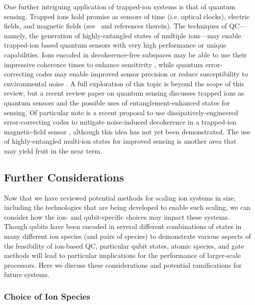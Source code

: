 \documentclass[%
12pt,
 amsmath,amssymb,
]{revtex4-2}
\begin{document}
One further intriguing application of trapped-ion systems is that of quantum sensing. Trapped ions hold promise as sensors of time (i.e. optical clocks), electric fields, and magnetic fields (see~\cite{DegenQuantumSensingRMP2017} and references therein). The techniques of QC---namely, the generation of highly-entangled states of multiple ions---may enable trapped-ion based quantum sensors with very high performance or unique capabilities. Ions encoded in decoherence-free subspaces may be able to use their impressive coherence times to enhance sensitivity \cite{SchmidtKalerEntangledSensor2012}, while quantum error-correcting codes may enable improved sensor precision or reduce susceptibility to environmental noise \cite{OzeriHeisenberg2013, DurImprovedmetrology2014}. A full exploration of this topic is beyond the scope of this review, but a recent review paper on quantum sensing \cite{DegenQuantumSensingRMP2017} discusses trapped ions as quantum sensors and the possible uses of entanglement-enhanced states for sensing. Of particular note is a recent proposal to use dissipatively-engineered error-correcting codes to mitigate noise-induced decoherence in a trapped-ion magnetic-field sensor \cite{ReiterDissipativeSensing2017}, although this idea has not yet been demonstrated. The use of highly-entangled multi-ion states for improved sensing is another area that may yield fruit in the near term.

\subsection{Further Considerations}

Now that we have reviewed potential methods for scaling ion systems in size, including the technologies that are being developed to enable such scaling, we can consider how the ion- and qubit-specific choices may impact these systems.  Though qubits have been encoded in several different combinations of states in many different ion species (and pairs of species) to demonstrate various aspects of the feasibility of ion-based QC, particular qubit states, atomic species, and gate methods will lead to particular implications for the performance of larger-scale processors.  Here we discuss these considerations and potential ramifications for future systems.

  \subsubsection{Choice of Ion Species}
\end{document}
